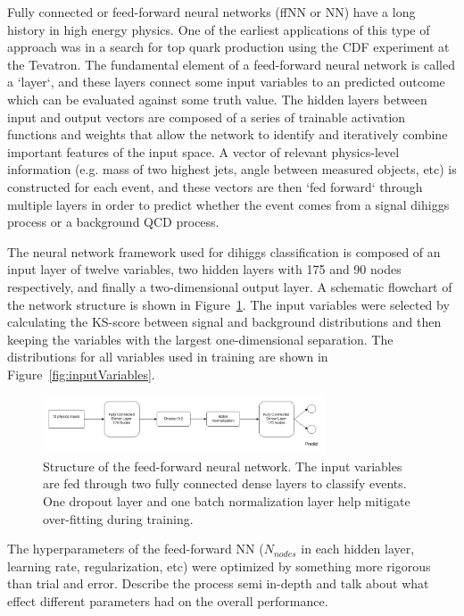 \label{sec:NN}
Fully connected or feed-forward neural networks (ffNN or NN) have a long history in high energy physics. One of the earliest applications of this type of approach was in a search for top quark production using the CDF experiment at the Tevatron. The fundamental element of a feed-forward neural network is called a `layer`, and these layers connect some input variables to an predicted outcome which can be evaluated against some truth value. The hidden layers between input and output vectors are composed of a series of trainable activation functions and weights that allow the network to identify and iteratively combine important features of the input space. A vector of relevant physics-level information (e.g. mass of two highest \pt jets, angle between measured objects, etc) is constructed for each event, and these vectors are then `fed forward` through multiple layers in order to predict whether the event comes from a signal dihiggs process or a background QCD process.

The neural network framework used for dihiggs classification is composed of an input layer of twelve variables, two hidden layers with 175 and 90 nodes respectively, and finally a two-dimensional output layer. A schematic flowchart of the network structure is shown in Figure~\ref{fig:nn}. The input variables were selected by calculating the KS-score between signal and background distributions and then keeping the variables with the largest one-dimensional separation. The distributions for all variables used in training are shown in Figure~\ref{fig:inputVariables}.

\begin{figure}[!h] 
\begin{center}
\includegraphics*[width=0.75\textwidth] {ffNN/figures/flowchart_ffNN.png}
\caption{Structure of the feed-forward neural network. The input variables are fed through two fully connected dense layers to classify events. One dropout layer and one batch normalization layer help mitigate over-fitting during training.}
  \label{fig:nn}
\end{center}
\end{figure}

The hyperparameters of the feed-forward NN ($N_{nodes}$ in each hidden layer, learning rate, regularization, etc) were optimized by something more rigorous than trial and error. Describe the process semi in-depth and talk about what effect different parameters had on the overall performance.

